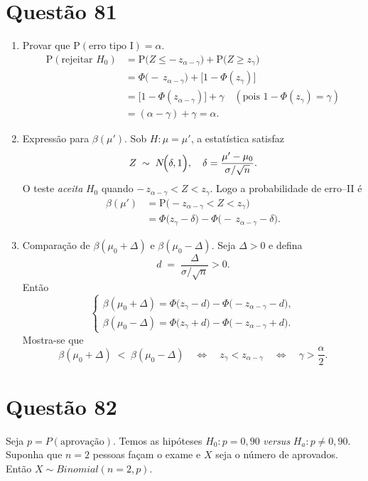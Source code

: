 \documentclass[12pt]{article}
\newcommand{\quest}[1]{\section*{Questão #1}} %
\begin{document}
\quest{81}
\begin{enumerate}
    \item Provar que $\mathrm{P}(\text{erro tipo I})=\alpha$.
    \begin{align*} \mathrm{P}(\text{rejeitar }H_0) &= \mathrm{P}\bigl(Z \le -\,z_{\alpha-\gamma}\bigr) + \mathrm{P}\bigl(Z \ge z_{\gamma}\bigr) \\ &= \Phi\bigl(-\,z_{\alpha-\gamma}\bigr) + \bigl[1 - \Phi(z_{\gamma})\bigr] \\ &= \bigl[1 - \Phi(z_{\alpha-\gamma})\bigr] + \gamma \quad(\text{pois }1-\Phi(z_{\gamma})=\gamma) \\ &= (\alpha-\gamma)+\gamma =\alpha.
    \end{align*}
    
    \item Expressão para $\beta(\mu')$.
    Sob $H\colon\mu=\mu'$, a estatística satisfaz
    $$Z\;\sim\;N\!\Bigl(\delta,1\Bigr), \quad \delta = \frac{\mu' - \mu_0}{\sigma/\sqrt n}.$$
    O teste \emph{aceita} $H_0$ quando
    $-\,z_{\alpha-\gamma} < Z < z_{\gamma}$.  
    Logo a probabilidade de erro–II é
    $$\begin{aligned} \beta(\mu') &= \mathrm{P}\bigl(-z_{\alpha-\gamma} < Z < z_{\gamma}\bigr) \\ &= \Phi\bigl(z_{\gamma}-\delta\bigr) - \Phi\bigl(-\,z_{\alpha-\gamma}-\delta\bigr). \end{aligned}$$
    
    \item Comparação de $\beta(\mu_0+\Delta)$ e $\beta(\mu_0-\Delta)$.
    Seja $\Delta>0$ e defina
    $$d \;=\;\frac{\Delta}{\sigma/\sqrt n}>0.$$
    Então
    $$\begin{cases} \displaystyle \beta(\mu_0+\Delta) =\Phi\bigl(z_{\gamma}-d\bigr) -\Phi\bigl(-z_{\alpha-\gamma}-d\bigr), \\[1em] \displaystyle \beta(\mu_0-\Delta) =\Phi\bigl(z_{\gamma}+d\bigr) -\Phi\bigl(-z_{\alpha-\gamma}+d\bigr). \end{cases}$$
    Mostra-se que
    $$\beta(\mu_0+\Delta)\;<\;\beta(\mu_0-\Delta) \quad\Longleftrightarrow\quad z_{\gamma} < z_{\alpha-\gamma} \quad\Longleftrightarrow\quad \gamma > \frac\alpha2.$$
\end{enumerate}

\quest{82}
Seja $p = P(\text{aprovação})$. Temos as hipóteses $H_0: p=0,90$ \textit{versus} $H_a: p \neq 0,90$. Suponha que $n=2$ pessoas façam o exame e $X$ seja o número de aprovados. Então $X \sim Binomial(n=2, p)$.\\
\end{document}
